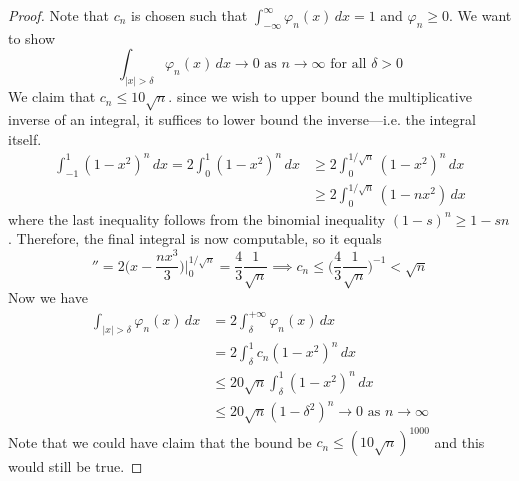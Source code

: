   \begin{proof}
    Note that $c_n$ is chosen such that $\int_{-\infty}^\infty \varphi_n (x) \,dx = 1$ and $\varphi_n \geq 0$. We want to show 
    \begin{equation}
      \int_{|x| > \delta} \varphi_n (x) \,dx \to 0 \text{ as } n \to \infty \text{ for all } \delta > 0
    \end{equation}
    We claim that $c_n \leq 10 \sqrt{n}$. since we wish to upper bound the multiplicative inverse of an integral, it suffices to lower bound the inverse---i.e. the integral itself. 
    \begin{align}
      \int_{-1}^1 (1 - x^2)^n \,dx = 2 \int_0^1 (1 - x^2)^n \,dx & \geq 2 \int_0^{1/\sqrt{n}} (1 - x^2)^n \,dx \\
                                                                 & \geq 2 \int_0^{1/\sqrt{n}} (1 - nx^2) \,dx 
    \end{align}
    where the last inequality follows from the binomial inequality $(1 - s)^n \geq 1 - sn$. Therefore, the final integral is now computable, so it equals 
    \begin{equation}
      '' = 2 \bigg(x - \frac{nx^3}{3}\bigg) \bigg|_0^{1/\sqrt{n}} = \frac{4}{3} \frac{1}{\sqrt{n}} \implies c_n \leq \bigg( \frac{4}{3} \frac{1}{\sqrt{n}})^{-1} < \sqrt{n}
    \end{equation}  
    Now we have 
    \begin{align}
      \int_{|x| > \delta} \varphi_n (x) \,dx & = 2 \int_\delta^{+\infty} \varphi_n (x) \,dx \\ 
                                             & = 2 \int_\delta^1 c_n (1 - x^2)^n \,dx \\ 
                                             & \leq 20 \sqrt{n} \int_\delta^1 (1 - x^2)^n \,dx \\ 
                                             & \leq 20 \sqrt{n} (1 - \delta^2)^n \to 0 \text{ as } n \to \infty 
    \end{align} 
    Note that we could have claim that the bound be $c_n \leq (10\sqrt{n})^{1000}$ and this would still be true. 
  \end{proof} 


